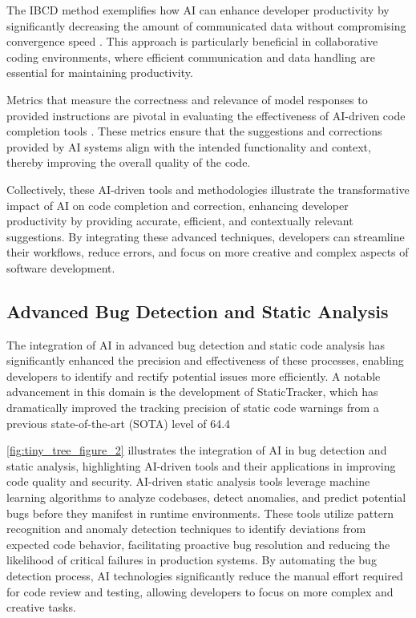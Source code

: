 The IBCD method exemplifies how AI can enhance developer productivity by significantly decreasing the amount of communicated data without compromising convergence speed \cite{mishchenko201999distributedoptimizationwaste}. This approach is particularly beneficial in collaborative coding environments, where efficient communication and data handling are essential for maintaining productivity.



Metrics that measure the correctness and relevance of model responses to provided instructions are pivotal in evaluating the effectiveness of AI-driven code completion tools \cite{liu2024visual}. These metrics ensure that the suggestions and corrections provided by AI systems align with the intended functionality and context, thereby improving the overall quality of the code.



Collectively, these AI-driven tools and methodologies illustrate the transformative impact of AI on code completion and correction, enhancing developer productivity by providing accurate, efficient, and contextually relevant suggestions. By integrating these advanced techniques, developers can streamline their workflows, reduce errors, and focus on more creative and complex aspects of software development.




\subsection{Advanced Bug Detection and Static Analysis} \label{subsec:Advanced Bug Detection and Static Analysis}

The integration of AI in advanced bug detection and static code analysis has significantly enhanced the precision and effectiveness of these processes, enabling developers to identify and rectify potential issues more efficiently. A notable advancement in this domain is the development of StaticTracker, which has dramatically improved the tracking precision of static code warnings from a previous state-of-the-art (SOTA) level of 64.4%

\autoref{fig:tiny_tree_figure_2} illustrates the integration of AI in bug detection and static analysis, highlighting AI-driven tools and their applications in improving code quality and security. AI-driven static analysis tools leverage machine learning algorithms to analyze codebases, detect anomalies, and predict potential bugs before they manifest in runtime environments. These tools utilize pattern recognition and anomaly detection techniques to identify deviations from expected code behavior, facilitating proactive bug resolution and reducing the likelihood of critical failures in production systems. By automating the bug detection process, AI technologies significantly reduce the manual effort required for code review and testing, allowing developers to focus on more complex and creative tasks.


